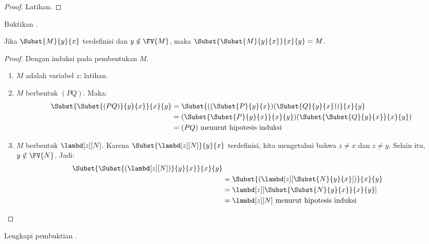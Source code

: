 \documentclass[../../../include/open-logic-section]{subfiles}
\begin{document}
\begin{proof}
  Latihan.
\end{proof}

\begin{prob}
  Buktikan .
\end{prob}


\begin{thm}
  Jika $\Subst{M}{y}{x}$ terdefinisi dan $y \notin \FV{M}$, maka
  $\Subst{\Subst{M}{y}{x}}{x}{y} = M$.
\end{thm}

\begin{proof}
  Dengan induksi pada pembentukan $M$.
  \begin{enumerate}
  \item $M$ adalah variabel $z$: latihan.
  \item $M$ berbentuk $(PQ)$. Maka:
    \begin{align*}
      \Subst{\Subst{(PQ)}{y}{x}}{x}{y}
      &=\Subst{((\Subst{P}{y}{x})(\Subst{Q}{y}{x}))}{x}{y} \\
      &= (\Subst{\Subst{P}{y}{x}}{x}{y})(\Subst{\Subst{Q}{y}{x}}{x}{y}) \\
      &= (PQ) \text{ menurut hipotesis induksi}
    \end{align*}
  \item $M$ berbentuk $\lambd[z][N]$. Karena
    $\Subst{\lambd[z][N]}{y}{x}$ terdefinisi, kita mengetahui bahwa
    $z \neq x$ dan $z \neq y$. Selain itu, $y \notin \FV{N}$. Jadi:
    \begin{align*}
      \Subst{\Subst{(\lambd[z][N])}{y}{x}}{x}{y}\\
      & = \Subst{(\lambd[z][\Subst{N}{y}{x}])}{x}{y} \\
      & = \lambd[z][\Subst{\Subst{N}{y}{x}}{x}{y}] \\
      &= \lambd[z][N] \text{ menurut hipotesis induksi}
    \end{align*}
  \end{enumerate}
\end{proof}

\begin{prob}
  Lengkapi pembuktian .
\end{prob}
\end{document}
